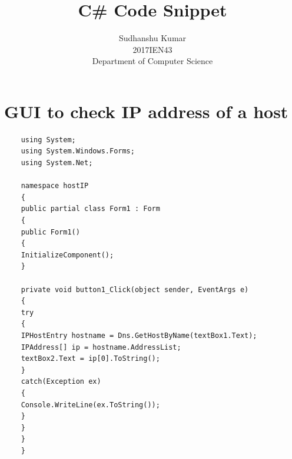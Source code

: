 \documentclass{article}
\title{C\# Code Snippet}
\author{
	Sudhanshu Kumar\\
	2017IEN43\\
	Department of Computer Science
}
\begin{document}
	\maketitle
	\break
	\section*{GUI to check IP address of a host}
	
	\begin{verbatim}
	using System;
	using System.Windows.Forms;
	using System.Net;
	
	namespace hostIP
	{
	public partial class Form1 : Form
	{
	public Form1()
	{
	InitializeComponent();
	}
	
	private void button1_Click(object sender, EventArgs e)
	{
	try
	{
	IPHostEntry hostname = Dns.GetHostByName(textBox1.Text);
	IPAddress[] ip = hostname.AddressList;
	textBox2.Text = ip[0].ToString();
	}
	catch(Exception ex)
	{
	Console.WriteLine(ex.ToString());
	}
	}
	}
	}
	
	
	\end{verbatim}
	
\end{document}

